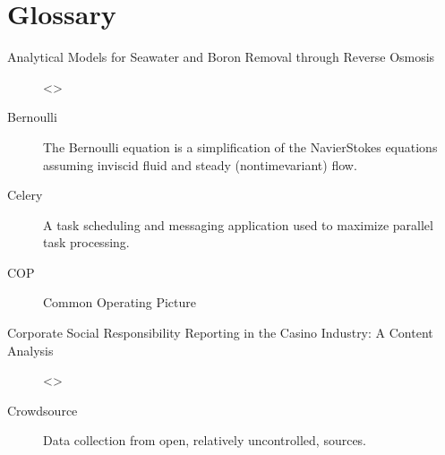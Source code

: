 \documentclass[letterpaper,12pt,english]{book}
\begin{document}
\section{Glossary}
\label{\detokenize{glossary:glossary}}\label{\detokenize{glossary::doc}}\begin{description}
\item[{Analytical Models for Seawater and Boron Removal through Reverse Osmosis\label{\detokenize{glossary:term-Analytical-Models-for-Seawater-and-Boron-Removal-through-Reverse-Osmosis}}}] \leavevmode
\sphinxAtStartPar
\textless{}\textgreater{}

\item[{Bernoulli\label{\detokenize{glossary:term-Bernoulli}}}] \leavevmode
\sphinxAtStartPar
The Bernoulli equation is a simplification of the Navier\sphinxhyphen{}Stokes equations assuming inviscid fluid and steady (non\sphinxhyphen{}time\sphinxhyphen{}variant) flow.

\item[{Celery\label{\detokenize{glossary:term-Celery}}}] \leavevmode
\sphinxAtStartPar
A task scheduling and messaging application used to maximize parallel task processing.

\item[{COP\label{\detokenize{glossary:term-COP}}}] \leavevmode
\sphinxAtStartPar
Common Operating Picture

\item[{Corporate Social Responsibility Reporting in the Casino Industry: A Content Analysis\label{\detokenize{glossary:term-Corporate-Social-Responsibility-Reporting-in-the-Casino-Industry-A-Content-Analysis}}}] \leavevmode
\sphinxAtStartPar
\textless{}\textgreater{}

\item[{Crowdsource\label{\detokenize{glossary:term-Crowdsource}}}] \leavevmode
\sphinxAtStartPar
Data collection from open, relatively un\sphinxhyphen{}controlled, sources.


\end{description}
\end{document}
